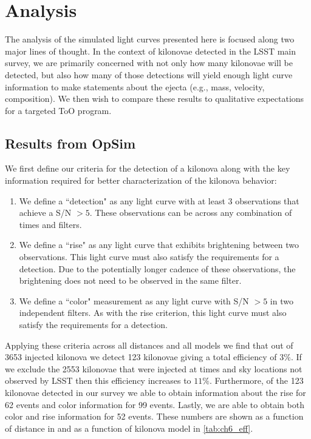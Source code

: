 \section{Analysis}
\label{sec:ch6_analysis}
The analysis of the simulated light curves presented here is focused along two major lines of thought. In the context of kilonovae detected in the LSST main survey, we are primarily concerned with not only how many kilonovae will be detected, but also how many of those detections will yield enough light curve information to make statements about the ejecta (e.g., mass, velocity, composition). We then wish to compare these results to qualitative expectations for a targeted ToO program.


\subsection{Results from OpSim}
\label{sec:ch6_opsim_results}
We first define our criteria for the detection of a kilonova along with the key information required for better characterization of the kilonova behavior:
\begin{enumerate}
\item We define a ``detection" as any light curve with at least 3 observations that achieve a S/N $> 5$. These observations can be across any combination of times and filters.
\item We define a ``rise" as any light curve that exhibits brightening between two observations. This light curve must also satisfy the requirements for a detection. Due to the potentially longer cadence of these observations, the brightening does not need to be observed in the same filter.
\item We define a ``color" measurement as any light curve with S/N $> 5$ in two independent filters. As with the rise criterion, this light curve must also satisfy the requirements for a detection.
\end{enumerate}

Applying these criteria across all distances and all models we find that out of 3653 injected kilonova we detect 123 kilonovae giving a total efficiency of $3\%$. If we exclude the 2553 kilonovae that were injected at times and sky locations not observed by LSST then this efficiency increases to $11\%$. Furthermore, of the 123 kilonovae detected in our survey we able to obtain information about the rise for 62 events and color information for 99 events. Lastly, we are able to obtain both color and rise information for 52 events. These numbers are shown as a function of distance in  and as a function of kilonova model in \cref{tab:ch6_eff}.

